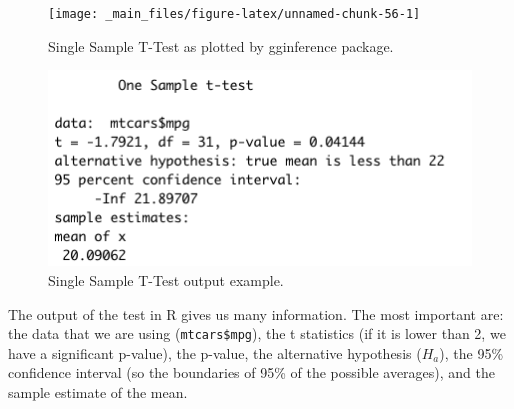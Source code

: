 \documentclass[
]{svmono}
\newenvironment{Shaded}{\begin{snugshade}}{\end{snugshade}}
\newcommand{\AttributeTok}[1]{\textcolor[rgb]{0.13,0.29,0.53}{#1}}
\newcommand{\CommentTok}[1]{\textcolor[rgb]{0.56,0.35,0.01}{\textit{#1}}}
\newcommand{\DecValTok}[1]{\textcolor[rgb]{0.00,0.00,0.81}{#1}}
\newcommand{\FunctionTok}[1]{\textcolor[rgb]{0.13,0.29,0.53}{\textbf{#1}}}
\newcommand{\NormalTok}[1]{#1}
\newcommand{\SpecialCharTok}[1]{\textcolor[rgb]{0.81,0.36,0.00}{\textbf{#1}}}
\newcommand{\StringTok}[1]{\textcolor[rgb]{0.31,0.60,0.02}{#1}}
\begin{document}
\begin{Shaded}
\end{Shaded}

\begin{figure}[H]

{\centering \texttt{[image: \_main\_files/figure-latex/unnamed-chunk-56-1]} 

}

\caption{Single Sample T-Test as plotted by gginference package.}\label{fig:unnamed-chunk-56}
\end{figure}

\begin{figure}[H]

{\centering \includegraphics[width=0.5\linewidth,]{images/Schermata 2022-03-29 alle 16.14.37} 

}

\caption{Single Sample T-Test output example.}\label{fig:unnamed-chunk-57}
\end{figure}

The output of the test in R gives us many information. The most
important are: the data that we are using (\texttt{mtcars\$mpg}), the t
statistics (if it is lower than 2, we have a significant p-value), the
p-value, the alternative hypothesis (\(H_a\)), the 95\% confidence interval
(so the boundaries of 95\% of the possible averages), and the sample
estimate of the mean.
\end{document}
